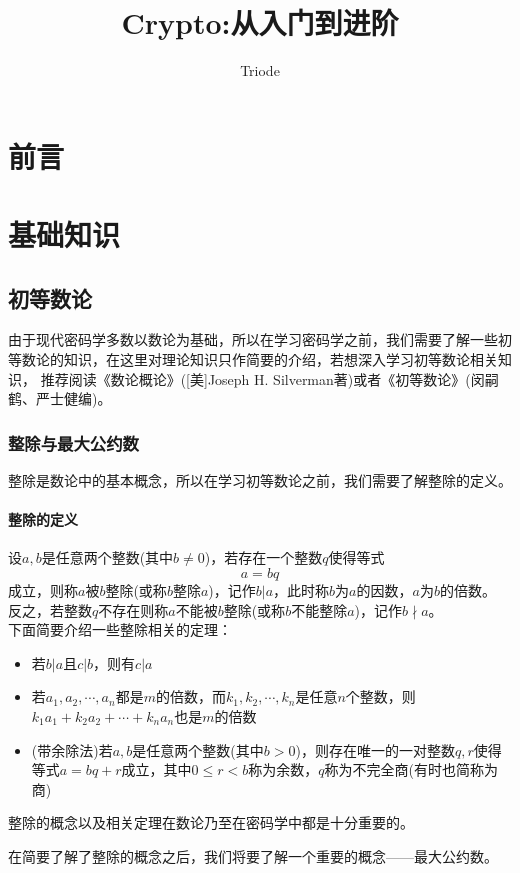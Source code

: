 \documentclass{article}
\numberwithin{equation}{subsubsection}
\begin{document}
\title{Crypto:从入门到进阶}
\author{Triode}
\date{}
\maketitle

\tableofcontents
\newpage
{}

\section{前言}
\newpage

\section{基础知识}
\subsection{初等数论}
由于现代密码学多数以数论为基础，所以在学习密码学之前，我们需要了解一些初等数论的知识，在这里对理论知识只作简要的介绍，若想深入学习初等数论相关知识，
推荐阅读《数论概论》([美]Joseph H. Silverman著)或者《初等数论》(闵嗣鹤、严士健编)。
\subsubsection{整除与最大公约数}
整除是数论中的基本概念，所以在学习初等数论之前，我们需要了解整除的定义。
\paragraph{\textbf{整除的定义}}
设$a,b$是任意两个整数(其中$b\neq 0$)，若存在一个整数$q$使得等式
\begin{equation}
    a = bq
    \nonumber
\end{equation}
成立，则称$a$被$b$整除(或称$b$整除$a$)，记作$b|a$，此时称$b$为$a$的因数，$a$为$b$的倍数。
反之，若整数$q$不存在则称$a$不能被$b$整除(或称$b$不能整除$a$)，记作$b\nmid a$。\\
下面简要介绍一些整除相关的定理：
\begin{itemize}
    \item 若$b|a$且$c|b$，则有$c|a$
    \item 若$a_1, a_2,\cdots,a_n$都是$m$的倍数，而$k_1,k_2,\cdots,k_n$是任意$n$个整数，则$k_1a_1+k_2a_2+\cdots+k_na_n$也是$m$的倍数
    \item (带余除法)若$a,b$是任意两个整数(其中$b>0$)，则存在唯一的一对整数$q,r$使得等式$a=bq+r$成立，其中$0\leq r < b$称为余数，$q$称为不完全商(有时也简称为商)
\end{itemize}
整除的概念以及相关定理在数论乃至在密码学中都是十分重要的。\par
在简要了解了整除的概念之后，我们将要了解一个重要的概念——最大公约数。
\end{document}
